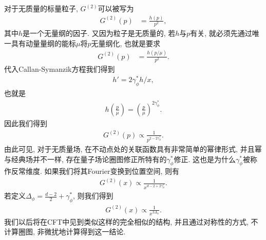 对于无质量的标量粒子, $G^{(2)}$可以被写为
\begin{align}
    G^{(2)}(p)&=\frac{h(p)}{p^2}, 
\end{align}
其中$h$是一个无量纲的因子. 又因为粒子是无质量的, 若$h$与$p$有关, 就必须先通过唯一具有动量量纲的能标$\mu$将$p$无量纲化, 也就是要求
\begin{align}
    G^{(2)}(p)&=\frac{h(p/\mu)}{p^2}.
\end{align}
代入Callan-Symanzik方程我们得到
\begin{align}
    h'=2\gamma_\phi^*h/x,
\end{align}
也就是
\begin{align}
    h(\frac p\mu)=\left(\frac p\mu\right)^{2\gamma_\phi^*}.
\end{align}
因此我们得到
\begin{align}
    G^{(2)}(p)\propto\frac1{p^{2-2\gamma_\phi^*}}.
\end{align}
由此可见, 对于无质量场, 在不动点处的关联函数具有非常简单的幂律形式, 并且幂与经典场并不一样, 存在量子场论圈图修正所特有的$\gamma_\phi^*$修正. 这也是为什么$\gamma_\phi^*$被称作反常维度. 如果我们将其Fourier变换到位置空间, 则有
\begin{align}
    G^{(2)}(x)\propto\frac1{x^{d-2+2\gamma_\phi^*}}.
\end{align}
若定义$\Delta_\phi=\frac{d-2}2+\gamma_\phi^*$, 则我们得到
\begin{align}
    G^{(2)}(x)\propto\frac1{x^{2\Delta_\phi}}.
\end{align}
我们以后将在CFT中见到类似这样的完全相似的结构, 并且通过对称性的方式, 不计算圈图, 非微扰地计算得到这一结论.
